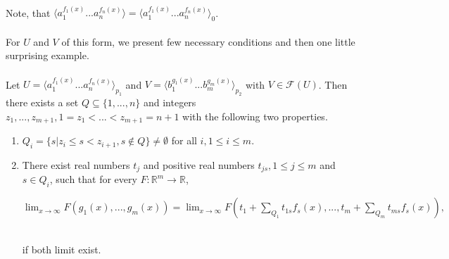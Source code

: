 \paragraph{}
Note, that $\langle a_{1}^{f_{1}(x)}...a_{n}^{f_{n}(x)} \rangle = \langle a_{1}^{f_{1}(x)}...a_{n}^{f_{n}(x)} \rangle_{0} $.

\paragraph{}
For $U$ and $V$ of this form, we present few necessary conditions and then one little surprising example.

\paragraph{}
\cveta Let $U = \langle a_{1}^{f_{1}(x)}...a_{n}^{f_{n}(x)} \rangle_{p_{1}} $ and $V = \langle b_{1}^{g_{1}(x)}...b_{m}^{g_{m}(x)} \rangle_{p_{2}} $ with $V \in \mathcal{F}(U) $. Then there exists a set $Q \subseteq \{ 1, ..., n \} $ and integers $z_{1}, ..., z_{m+1}, 1=z_{1} < ... < z_{m+1} = n+1 $ with the following two properties.
\begin{enumerate}
\item $Q_{i} = \{ s | z_{i} \leq s < z_{i+1}, s \notin Q \} \neq \emptyset $ for all $i, 1 \leq i \leq m$.
\item There exist real numbers $t_{j}$ and positive real numbers $t_{js}, 1 \leq j \leq m$ and $s \in Q_{i}$, such that for every $F: \mathbb{R}^{m} \rightarrow \mathbb{R}$, \\
\centerline{$\lim_{x\to \infty } F(g_{1}(x), ..., g_{m}(x)) = \lim_{x \to \infty}F(t_{1} + \sum_{Q_{1}}t_{1s}f_{s}(x), ..., t_{m} + \sum_{Q_{m}}t_{ms}f_{s}(x)),$} \\
if both limit exist.
\end{enumerate} 

\paragraph{}
